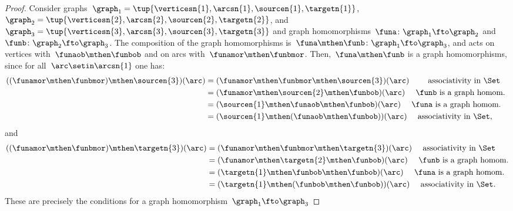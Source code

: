 \begin{proof}
    Consider graphs~$\graph_1=\tup{\verticesn{1},\arcsn{1},\sourcen{1},\targetn{1}}$,~$\graph_2=\tup{\verticesn{2},\arcsn{2},\sourcen{2},\targetn{2}}$, and~$\graph_3=\tup{\verticesn{3},\arcsn{3},\sourcen{3},\targetn{3}}$ and
    graph homomorphisms~$\funa \colon \graph_1 \fto \graph_2$ and~$\funb \colon \graph_2 \fto \graph_3$.
    The composition of the graph homomorphisms is~$\funa\mthen \funb \colon \graph_1 \fto \graph_3$, and acts on vertices with~$\funaob \mthen \funbob$ and on arcs with~$\funamor \mthen \funbmor$.
    Then,~$\funa\mthen \funb$ is a graph homomorphisms, since for all~$\arc \setin \arcsn{1}$ one has:
    \begin{equation*}
        \begin{aligned}
            ((\funamor\mthen \funbmor) \mthen \sourcen{3})(\arc) & =(\funamor\mthen \funbmor \mthen \sourcen{3})(\arc) \qquad \text{ associativity in \Set} \\
                                                               & =(\funamor\mthen \sourcen{2} \mthen \funbob)(\arc) \quad \text{ $\funb$ is a graph homom.
            } \\
                                                               & =(\sourcen{1} \mthen \funaob\mthen \funbob)(\arc) \quad \text{ $\funa$ is a graph homom.} \\
                                                               & =(\sourcen{1} \mthen (\funaob\mthen \funbob))(\arc) \quad \text{ associativity in \Set},
        \end{aligned}
    \end{equation*}
    and
    \begin{equation*}
        \begin{aligned}
            ((\funamor \mthen \funbmor) \mthen \targetn{3})(\arc) & =(\funamor \mthen \funbmor \mthen \targetn{3})(\arc) \quad \text{ associativity in \Set} \\
                                                                & =(\funamor \mthen \targetn{2}\mthen \funbob)(\arc) \quad \text{ $\funb$ is a graph homom.} \\
                                                                & =(\targetn{1} \mthen \funbob\mthen \funbob)(\arc)\quad \text{ $\funa$ is a graph homom.} \\
                                                                & =(\targetn{1} \mthen (\funbob\mthen \funbob))(\arc)\quad \text{ associativity in \Set}.
        \end{aligned}
    \end{equation*}
    These are precisely the conditions for a graph homomorphism~$\graph_1 \fto \graph_3$
\end{proof}
